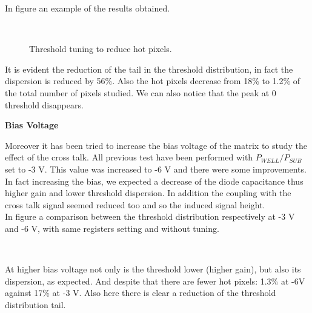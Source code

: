 In figure  an example of the results obtained.

\begin{figure}
\centering
{}\quad
{}\\
\caption{Threshold tuning to reduce hot pixels.}
\label{fig:tuning_hot}
\end{figure} 

It is evident the reduction of the tail in the threshold distribution, in fact the dispersion is reduced by 56\%. Also the hot pixels decrease from 18\% to 1.2\% of the total number of pixels studied. We can also notice that the peak at 0 threshold disappears.


\begin{description}
\item \textbf{Bias Voltage}
\end{description}

Moreover it has been tried to increase the bias voltage of the  matrix to study the effect of the cross talk. All previous test have been performed with $P_{WELL}/P_{SUB}$ set to -3 V. This value was increased to -6 V and there were some improvements. In fact increasing the bias, we expected a decrease of the diode capacitance thus higher gain and lower threshold dispersion. In addition the coupling with the cross talk signal seemed reduced too and so the induced signal height. \\
In figure  a comparison between the threshold distribution respectively at -3 V and -6 V, with same registers setting and without tuning.

\begin{figure}[h!]
\centering
{}\quad
{}\\
\label{fig:bias_comp}
\end{figure}

At higher bias voltage not only is the threshold lower (higher gain), but also its dispersion, as expected. And despite that there are fewer hot pixels: 1.3\% at -6V against 17\% at -3 V. Also here there is clear a reduction of the threshold distribution tail. 

